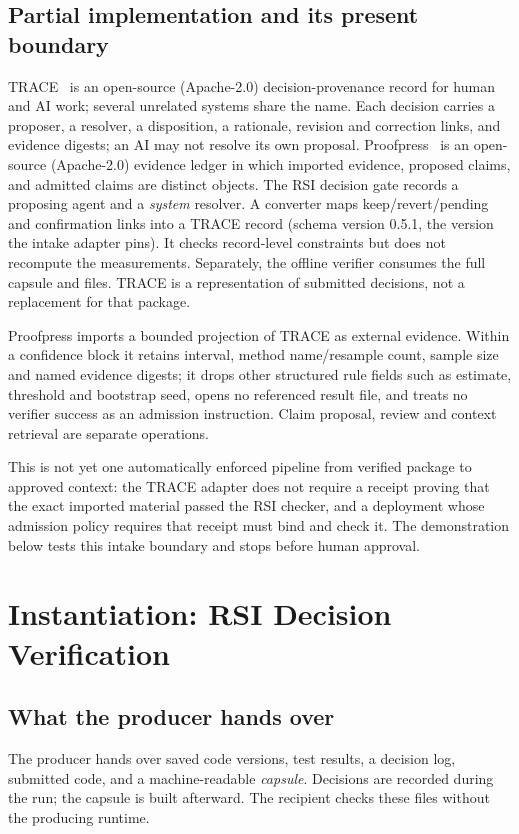 \documentclass[conference]{IEEEtran}
\begin{document}
\subsection{Partial implementation and its present boundary}
TRACE~\cite{trace} is an open-source (Apache-2.0) decision-provenance record for human and AI work; several unrelated systems share the name. Each decision carries a proposer, a resolver, a disposition, a rationale, revision and correction links, and evidence digests; an AI may not resolve its own proposal. Proofpress~\cite{proofpress} is an open-source (Apache-2.0) evidence ledger in which imported evidence, proposed claims, and admitted claims are distinct objects. The RSI decision gate records a proposing agent and a \emph{system} resolver. A converter maps keep/revert/pending and confirmation links into a TRACE record (schema version 0.5.1, the version the intake adapter pins). It checks record-level constraints but does not recompute the measurements. Separately, the offline verifier consumes the full capsule and files. TRACE is a representation of submitted decisions, not a replacement for that package.

Proofpress imports a bounded projection of TRACE as external evidence. Within a confidence block it retains interval, method name/resample count, sample size and named evidence digests; it drops other structured rule fields such as estimate, threshold and bootstrap seed, opens no referenced result file, and treats no verifier success as an admission instruction. Claim proposal, review and context retrieval are separate operations.

This is not yet one automatically enforced pipeline from verified package to approved context: the TRACE adapter does not require a receipt proving that the exact imported material passed the RSI checker, and a deployment whose admission policy requires that receipt must bind and check it. The demonstration below tests this intake boundary and stops before human approval.

\section{Instantiation: RSI Decision Verification}
\subsection{What the producer hands over}
The producer hands over saved code versions, test results, a decision log, submitted code, and a machine-readable \emph{capsule}. Decisions are recorded during the run; the capsule is built afterward. The recipient checks these files without the producing runtime.
\end{document}
